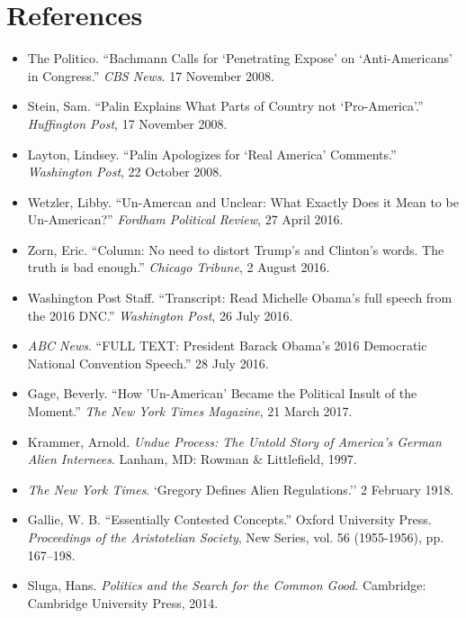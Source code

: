 \section*{References}
{
\small
\begin{itemize}[label={},itemindent=-2em,leftmargin=2em]	
	\item The Politico. ``Bachmann Calls for `Penetrating Expose' on `Anti-Americans' in Congress.'' \textit{CBS News}. 17 November 2008. 

	\item Stein, Sam. ``Palin Explains What Parts of Country not `Pro-America'.'' \textit{Huffington Post}, 17 November 2008. 
	
	\item Layton, Lindsey. ``Palin Apologizes for `Real America' Comments.'' \textit{Washington Post}, 22 October 2008. 
	
	\item Wetzler, Libby. ``Un-Amercan and Unclear: What Exactly Does it Mean to be Un-American?'' \textit{Fordham Political Review}, 27 April 2016. 
	
	\item Zorn, Eric. ``Column: No need to distort Trump's and Clinton's words. The truth is bad enough.'' \textit{Chicago Tribune}, 2 August 2016. 
	
	\item Washington Post Staff. ``Transcript: Read Michelle Obama's full speech from the 2016 DNC.'' \textit{Washington Post}, 26 July 2016. 
	
	\item \textit{ABC News}. ``FULL TEXT: President Barack Obama's 2016 Democratic National Convention Speech.'' 28 July 2016. 
	
	\item Gage, Beverly. ``How 'Un-American’ Became the Political Insult of the Moment.'' \textit{The New York Times Magazine}, 21 March 2017.

	\item Krammer, Arnold. \textit{Undue Process: The Untold Story of America's German Alien Internees}. Lanham, MD: Rowman \& Littlefield, 1997. 

	\item \textit{The New York Times}. `Gregory Defines Alien Regulations.'' 2 February 1918. 

	\item Gallie, W. B. ``Essentially Contested Concepts.'' Oxford University Press. \textit{Proceedings of the Aristotelian Society}, New Series, vol. 56 (1955-1956), pp. 167--198.

	\item Sluga, Hans. \textit{Politics and the Search for the Common Good}. Cambridge: Cambridge University Press, 2014.
\end{itemize}
}
